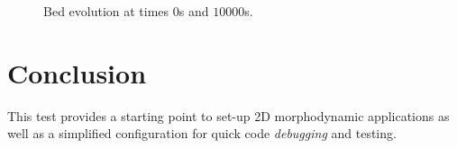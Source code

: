 \begin{figure}[H]
 \begin{minipage}[t]{0.5\textwidth}
  \centering
 \end{minipage}%
 \begin{minipage}[t]{0.5\textwidth}
  \centering
 \end{minipage}
 \caption{Bed evolution at times $0$s and $10000$s.}
 \label{fig:hippodrome-t2d:solution}
\end{figure}


\section{Conclusion}
This test provides a starting point to set-up 2D morphodynamic applications as well as a simplified configuration for quick code \textit{debugging} and testing.
%
%
%
%




